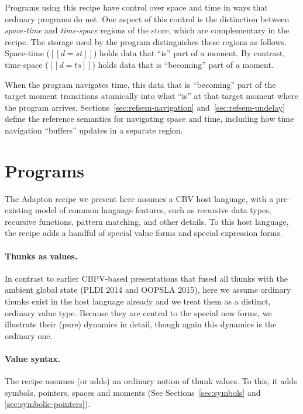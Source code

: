 \documentclass[11pt]{article}
\begin{document}
Programs using this recipe have control over space and time in ways
that ordinary programs do not.
%
One aspect of this control is the distinction between
\emph{space-time} and \emph{time-space} regions of the store, which are complementary in
the recipe.
%
The storage used by the program distinguishes these regions as follows.
%
Space-time ($[[d = st]]$) holds data that ``is'' part of a moment.
By contrast,
time-space ($[[d = ts]]$) holds data that is ``becoming'' part of a moment.

When the program navigates time, this data that is ``becoming'' part
of the target moment transitions atomically into what ``is'' at that
target moment where the program arrives.
%
Sections~\ref{sec:refsem-navigation} and~\ref{sec:refsem-undelay}
define the reference semantics for navigating space and time, including
how time navigation ``buffers'' updates in a separate region.


\section{Programs}
\label{sec:programs}

The Adapton recipe we present here assumes a CBV host language, with a
pre-existing model of common language features, such as recursive data
types, recursive functions, pattern matching, and other details.
%
To this host language, the recipe adds a handful of special value
forms and special expression forms.

\paragraph{Thunks as values.}
In contrast to earlier CBPV-based presentations that fused all thunks
with the ambient global state (PLDI 2014 and OOPSLA 2015), here we
assume ordinary thunks exist in the host language already and we treat
them as a distinct, ordinary value type.
%
Because they are central to the special new forms, we illustrate their
(pure) dynamics in detail, though again this dynamics is the ordinary one.

\paragraph{Value syntax.}
The recipe assumes (or adds) an ordinary notion of thunk values.
%
To this, it adds symbols, pointers, spaces and moments (See Sections~\ref{sec:symbols} and \ref{sec:symbolic-pointers}).

\ottgrammartabular{
  \ottv
}
\end{document}
